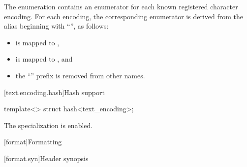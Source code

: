 \begin{note}
The  enumeration
contains an enumerator for each known registered character encoding.
For each encoding, the corresponding enumerator is derived from
the alias beginning with ``'', as follows:
\begin{itemize}
\item
{} is mapped to ,
\item
{} is mapped to , and
\item
the ``'' prefix is removed from other names.
\end{itemize}
\end{note}

[text.encoding.hash]{Hash support}

%
\begin{itemdecl}
template<> struct hash<text_encoding>;
\end{itemdecl}

\begin{itemdescr}
\pnum
The specialization is enabled.
\end{itemdescr}

[format]{Formatting}

[format.syn]{Header  synopsis}

